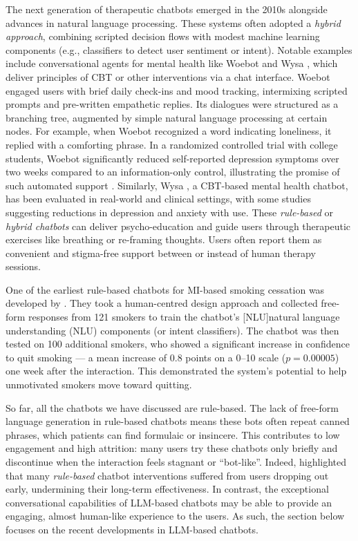 The next generation of therapeutic chatbots emerged in the 2010s alongside advances in natural language processing. These systems often adopted a \emph{hybrid approach}, combining scripted decision flows with modest machine learning components (e.g., classifiers to detect user sentiment or intent). Notable examples include conversational agents for mental health like Woebot \cite{Fitzpatrick2017} and Wysa \cite{Chang2024}, which deliver principles of CBT or other interventions via a chat interface. Woebot engaged users with brief daily check-ins and mood tracking, intermixing scripted prompts and pre-written empathetic replies. Its dialogues were structured as a branching tree, augmented by simple natural language processing at certain nodes. For example, when Woebot recognized a word indicating loneliness, it replied with a comforting phrase. In a randomized controlled trial with college students, Woebot significantly reduced self-reported depression symptoms over two weeks compared to an information-only control, illustrating the promise of such automated support \cite{Fitzpatrick2017}. Similarly, Wysa \cite{Chang2024}, a CBT-based mental health chatbot, has been evaluated in real-world and clinical settings, with some studies suggesting reductions in depression and anxiety with use. These \emph{rule-based} or \emph{hybrid chatbots} can deliver psycho-education and guide users through therapeutic exercises like breathing or re-framing thoughts. Users often report them as convenient and stigma-free support between or instead of human therapy sessions.

One of the earliest rule-based chatbots for MI-based smoking cessation was developed by \citet{almusharraf2018motivating}. They took a human-centred design approach and collected free-form responses from 121 smokers to train the chatbot's [NLU]natural language understanding (NLU) components (or intent classifiers). The chatbot was then tested on 100 additional smokers, who showed a significant increase in confidence to quit smoking --- a mean increase of 0.8 points on a 0–10 scale ($p=0.00005$) one week after the interaction. This demonstrated the system's potential to help unmotivated smokers move toward quitting.

So far, all the chatbots we have discussed are rule-based. The lack of free-form language generation in rule-based chatbots means these bots often repeat canned phrases, which patients can find formulaic or insincere. This contributes to low engagement and high attrition: many users try these chatbots only briefly and discontinue when the interaction feels stagnant or ``bot-like''. Indeed, \citet{LIMPANOPPARAT2024100081} highlighted that many \emph{rule-based} chatbot interventions suffered from users dropping out early, undermining their long-term effectiveness. In contrast, the exceptional conversational capabilities of LLM-based chatbots may be able to provide an engaging, almost human-like experience to the users. As such, the section below focuses on the recent developments in LLM-based chatbots.


